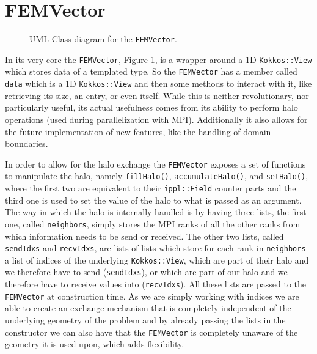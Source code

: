 \section{FEMVector}
\begin{figure}[!ht]
    \centering
    
    \caption{UML Class diagram for the \texttt{FEMVector}.}
    \label{fig:uml_femvector}
\end{figure}
In its very core the \texttt{FEMVector}, Figure \ref{fig:uml_femvector}, is a wrapper around a 1D \texttt{Kokkos::View} which stores data of a templated type. So the \texttt{FEMVector} has a member called \texttt{data} which is a 1D \texttt{Kokkos::View} and then some methods to interact with it, like retrieving its size, an entry, or even itself. While this is neither revolutionary, nor particularly useful, its actual usefulness comes from its ability to perform halo operations (used during parallelization with MPI). Additionally it also allows for the future implementation of new features, like the handling of domain boundaries.\medskip

In order to allow for the halo exchange the \texttt{FEMVector} exposes a set of functions to manipulate the halo, namely \texttt{fillHalo()}, \texttt{accumulateHalo()}, and \texttt{setHalo()}, where the first two are equivalent to their \texttt{ippl::Field} counter parts and the third one is used to set the value of the halo to what is passed as an argument. The way in which the halo is internally handled is by having three lists, the first one, called \texttt{neighbors}, simply stores the MPI ranks of all the other ranks from which information needs to be send or received. The other two lists, called \texttt{sendIdxs} and \texttt{recvIdxs}, are lists of lists which store for each rank in \texttt{neighbors} a list of indices of the underlying \texttt{Kokkos::View}, which are part of their halo and we therefore have to send (\texttt{sendIdxs}), or which are part of our halo and we therefore have to receive values into (\texttt{recvIdxs}). All these lists are passed to the \texttt{FEMVector} at construction time. As we are simply working with indices we are able to create an exchange mechanism that is completely independent of the underlying geometry of the problem and by already passing the lists in the constructor we can also have that the \texttt{FEMVector} is completely unaware of the geometry it is used upon, which adds flexibility.\medskip

